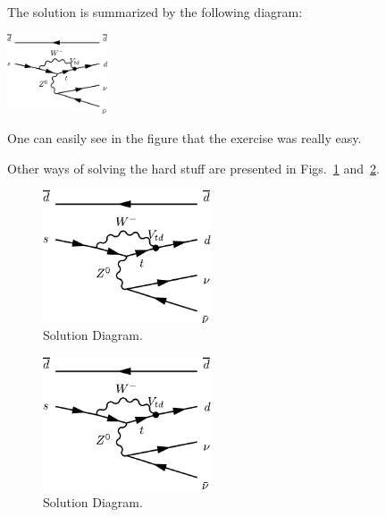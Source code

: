 \documentclass[11pt,a4paper]{article}
\begin{document}
\begin{solution} %
  The solution is summarized by the following diagram:
  \begin{center}
    \includegraphics[angle=90,width=30mm]{fig/penguin}
  \end{center}
  One can easily see in the figure that the exercise was really easy.

  Other ways of solving the hard stuff are presented in Figs.~\ref{fig:SolPenguin}
  and~\ref{fig:SolPenguin2}.
  \begin{figure}[b] %
    \centering
    \includegraphics[angle=35,width=50mm]{fig/penguin}
    \caption{Solution Diagram.}
    \label{fig:SolPenguin}
  \end{figure}
  \begin{figure}
    \centering
    \includegraphics[angle=235,width=50mm]{fig/penguin}
    \caption{Solution Diagram.}
    \label{fig:SolPenguin2}
  \end{figure}
\end{solution}
\end{document}

